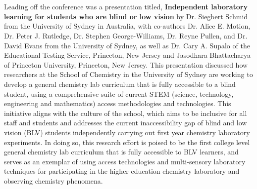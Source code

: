 \documentclass[11.5pt]{sig-alternate}
\begin{document}
\section*{\vspace{140mm}}
\begin{large}
  
Leading off the conference was a presentation titled, \textbf{Independent laboratory learning for students who are blind or low vision }by Dr. Siegbert Schmid  from the University of Sydney in Australia, with co-authors Dr. Alice E. Motion, Dr. Peter J. Rutledge, Dr. Stephen George-Williams, Dr. Reyne Pullen, and Dr. David Evans from the University of Sydney, as well as Dr. Cary A. Supalo of the Educational Testing Service, Princeton, New Jersey and Jasodhara Bhattacharya of Princeton University, Princeton, New Jersey. This presentation discussed how researchers at the School of Chemistry in the University of Sydney are working to develop a general chemistry lab curriculum that is fully accessible to a blind student, using a comprehensive suite of current STEM (science, technology, engineering and mathematics) access methodologies and technologies. This initiative aligns with the culture of the school, which aims to be inclusive for all staff and students and addresses the current inaccessibility gap of blind and low vision (BLV) students independently carrying out first year chemistry laboratory experiments. In doing so, this research effort is poised to be the first college level general chemistry lab curriculum that is fully accessible to BLV learners, and serves as an exemplar of using access technologies and multi-sensory laboratory techniques for participating in the higher education chemistry laboratory and observing chemistry phenomena.


\end{large}
\end{document}
